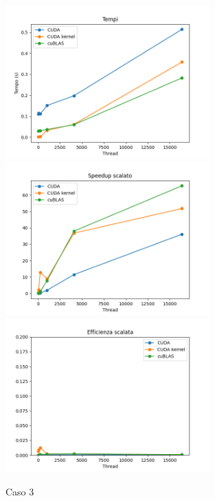 \begin{figure}[h]
    \centering
    \includegraphics[width=0.7\textwidth]{./imgs/graphs/caso_c.png}
    \includegraphics[width=0.7\textwidth]{./imgs/graphs/caso_c_scaled_speedup.png}
    \includegraphics[width=0.7\textwidth]{./imgs/graphs/caso_c_scaled_efficiency.png}
    \caption{Caso 3}
\end{figure}

